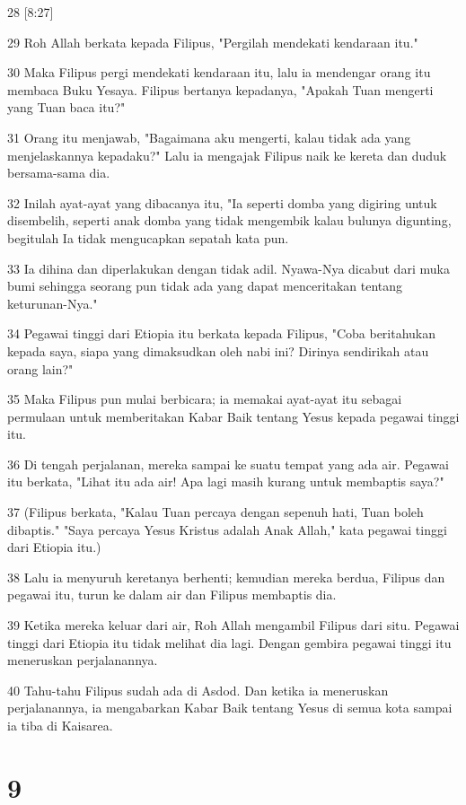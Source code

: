 \par 28 [8:27]
\par 29 Roh Allah berkata kepada Filipus, "Pergilah mendekati kendaraan itu."
\par 30 Maka Filipus pergi mendekati kendaraan itu, lalu ia mendengar orang itu membaca Buku Yesaya. Filipus bertanya kepadanya, "Apakah Tuan mengerti yang Tuan baca itu?"
\par 31 Orang itu menjawab, "Bagaimana aku mengerti, kalau tidak ada yang menjelaskannya kepadaku?" Lalu ia mengajak Filipus naik ke kereta dan duduk bersama-sama dia.
\par 32 Inilah ayat-ayat yang dibacanya itu, "Ia seperti domba yang digiring untuk disembelih, seperti anak domba yang tidak mengembik kalau bulunya digunting, begitulah Ia tidak mengucapkan sepatah kata pun.
\par 33 Ia dihina dan diperlakukan dengan tidak adil. Nyawa-Nya dicabut dari muka bumi sehingga seorang pun tidak ada yang dapat menceritakan tentang keturunan-Nya."
\par 34 Pegawai tinggi dari Etiopia itu berkata kepada Filipus, "Coba beritahukan kepada saya, siapa yang dimaksudkan oleh nabi ini? Dirinya sendirikah atau orang lain?"
\par 35 Maka Filipus pun mulai berbicara; ia memakai ayat-ayat itu sebagai permulaan untuk memberitakan Kabar Baik tentang Yesus kepada pegawai tinggi itu.
\par 36 Di tengah perjalanan, mereka sampai ke suatu tempat yang ada air. Pegawai itu berkata, "Lihat itu ada air! Apa lagi masih kurang untuk membaptis saya?"
\par 37 (Filipus berkata, "Kalau Tuan percaya dengan sepenuh hati, Tuan boleh dibaptis." "Saya percaya Yesus Kristus adalah Anak Allah," kata pegawai tinggi dari Etiopia itu.)
\par 38 Lalu ia menyuruh keretanya berhenti; kemudian mereka berdua, Filipus dan pegawai itu, turun ke dalam air dan Filipus membaptis dia.
\par 39 Ketika mereka keluar dari air, Roh Allah mengambil Filipus dari situ. Pegawai tinggi dari Etiopia itu tidak melihat dia lagi. Dengan gembira pegawai tinggi itu meneruskan perjalanannya.
\par 40 Tahu-tahu Filipus sudah ada di Asdod. Dan ketika ia meneruskan perjalanannya, ia mengabarkan Kabar Baik tentang Yesus di semua kota sampai ia tiba di Kaisarea.

\chapter{9}

